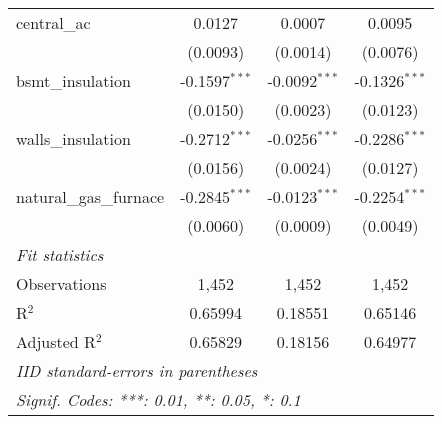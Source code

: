 \begin{tabular}{lccc}
   central\_ac             & 0.0127                                                                   & 0.0007                                                                      & 0.0095\\   
                           & (0.0093)                                                                 & (0.0014)                                                                    & (0.0076)\\   
   bsmt\_insulation        & -0.1597$^{***}$                                                          & -0.0092$^{***}$                                                             & -0.1326$^{***}$\\   
                           & (0.0150)                                                                 & (0.0023)                                                                    & (0.0123)\\   
   walls\_insulation       & -0.2712$^{***}$                                                          & -0.0256$^{***}$                                                             & -0.2286$^{***}$\\   
                           & (0.0156)                                                                 & (0.0024)                                                                    & (0.0127)\\   
   natural\_gas\_furnace   & -0.2845$^{***}$                                                          & -0.0123$^{***}$                                                             & -0.2254$^{***}$\\   
                           & (0.0060)                                                                 & (0.0009)                                                                    & (0.0049)\\   
   \midrule
   \emph{Fit statistics}\\
   Observations            & 1,452                                                                    & 1,452                                                                       & 1,452\\  
   R$^2$                   & 0.65994                                                                  & 0.18551                                                                     & 0.65146\\  
   Adjusted R$^2$          & 0.65829                                                                  & 0.18156                                                                     & 0.64977\\  
   \midrule \midrule
   \multicolumn{4}{l}{\emph{IID standard-errors in parentheses}}\\
   \multicolumn{4}{l}{\emph{Signif. Codes: ***: 0.01, **: 0.05, *: 0.1}}\\
\end{tabular}
\par\endgroup



